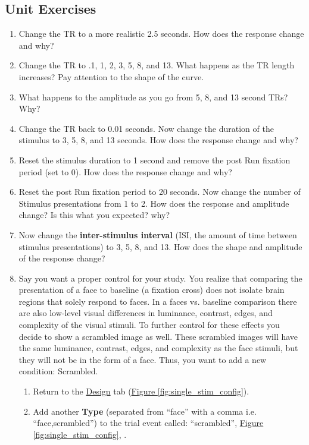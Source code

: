 \documentclass[10pt]{article}
\newcommand*\circled[1]{\tikz[baseline=(char.base)]{
            \node[shape=circle,draw,inner sep=.5pt] (char) {#1};}}
\begin{document}
	\subsection{Unit Exercises}
	\label{subsec:u1exercises}
		\begin{enumerate}
			\item Change the TR to a more realistic 2.5 seconds. How does the response change and why?
			\item Change the TR to .1, 1, 2, 3, 5, 8, and 13. What happens as the TR length increases? Pay attention to the shape of the curve.
			\item What happens to the amplitude as you go from 5, 8, and 13 second TRs? Why?
			\item Change the TR back to 0.01 seconds. Now change the duration of the stimulus to 3, 5, 8, and 13 seconds. How does the response change and why?
			\item Reset the stimulus duration to 1 second and remove the post Run fixation period (set to 0). How does the response change and why?
			\item Reset the post Run fixation period to 20 seconds. Now change the number of Stimulus presentations from 1 to 2. How does the response and amplitude change? Is this what you expected? why?
			\item Now change the \textbf{inter-stimulus interval} (ISI, the amount of time between stimulus presentations) to 3, 5, 8, and 13. How does the shape and amplitude of the response change?
			\item Say you want a proper control for your study.
			You realize that comparing the presentation of a face to baseline (a fixation cross) does not isolate brain regions that solely respond to faces.
			In a faces vs. baseline comparison there are also low-level visual differences in luminance, contrast, edges, and complexity of the visual stimuli.
			To further control for these effects you decide to show a scrambled image as well.
			These scrambled images will have the same luminance, contrast, edges, and complexity as the face stimuli, but they will not be in the form of a face.
			Thus, you want to add a new condition: Scrambled.
			\begin{enumerate}
				\item Return to the \hyperref[subsubsec:design]{Design} tab (\hyperref[fig:single_stim_config]{Figure \ref{fig:single_stim_config}}).
				\item Add another \textbf{Type} (separated from ``face'' with a comma i.e. ``face,scrambled'') to the trial event called: ``scrambled'', \hyperref[fig:single_stim_config]{Figure \ref{fig:single_stim_config}}, \circled{1}.

\end{enumerate}
\end{enumerate}
\end{document}
